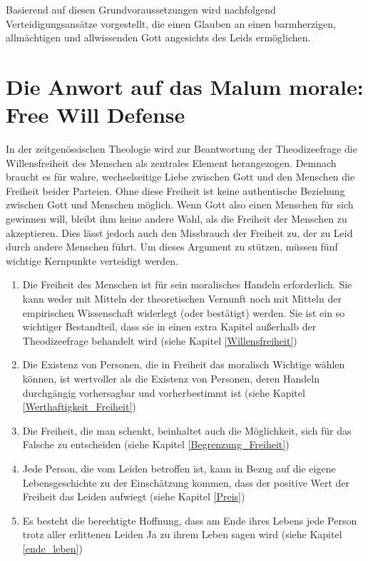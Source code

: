 Basierend auf diesen Grundvoraussetzungen wird nachfolgend Verteidigungsansätze vorgestellt, die einen Glauben an einen barmherzigen, allmächtigen und allwissenden Gott angesichts des Leids ermöglichen.

\section{Die Anwort auf das Malum morale: Free Will Defense} \label{free_will_defense}
In der zeitgenössischen Theologie wird zur Beantwortung der Theodizeefrage die Willensfreiheit des Menschen als zentrales Element herangezogen. Demnach braucht es für wahre, wechselseitige Liebe zwischen Gott und den Menschen die Freiheit beider Parteien. Ohne diese Freiheit ist keine authentische Beziehung zwischen Gott und Menschen möglich. Wenn Gott also einen Menschen für sich gewinnen will, bleibt ihm keine andere Wahl, als die Freiheit der Menschen zu akzeptieren. Dies lässt jedoch auch den Missbrauch der Freiheit zu, der zu Leid durch andere Menschen führt. Um dieses Argument zu stützen, müssen fünf wichtige Kernpunkte verteidigt werden.
\begin{enumerate}
	\item Die Freiheit des Menschen ist für sein moralisches Handeln erforderlich. Sie kann weder mit Mitteln der theoretischen Vernunft noch mit Mitteln der empirischen Wissenschaft widerlegt (oder bestätigt) werden. Sie ist ein so wichtiger Bestandteil, dass sie in einen extra Kapitel außerhalb der Theodizeefrage behandelt wird (siehe Kapitel \ref{Willensfreiheit})
	\item Die Existenz von Personen, die in Freiheit das moralisch Wichtige wählen können, ist wertvoller als die Existenz von Personen, deren Handeln durchgängig vorhersagbar und vorherbestimmt ist (siehe Kapitel \ref{Werthaftigkeit_Freiheit})
	\item Die Freiheit, die man schenkt, beinhaltet auch die Möglichkeit, sich für das Falsche zu entscheiden (siehe Kapitel \ref{Begrenzung_Freiheit})
	\item Jede Person, die vom Leiden betroffen ist, kann in Bezug auf die eigene Lebensgeschichte zu der Einschätzung kommen, dass der positive Wert der Freiheit das Leiden aufwiegt (siehe Kapitel \ref{Preis})
	\item Es besteht die berechtigte Hoffnung, dass am Ende ihres Lebens jede Person trotz aller erlittenen Leiden Ja zu ihrem Leben sagen wird (siehe Kapitel \ref{ende_leben})
\end{enumerate}


